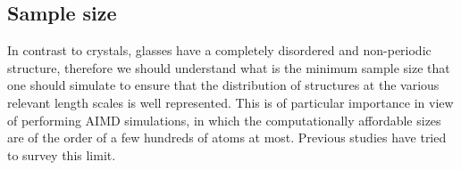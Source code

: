 



\subsection{Sample size}  \label{sec:silica-size}
In contrast to crystals, glasses have a completely disordered and non-periodic structure, therefore we should understand what is the minimum sample size that one should simulate to ensure that the distribution of structures at the various relevant length scales is well represented. This is of particular importance in view of performing AIMD simulations, in which the computationally affordable sizes are of the order of a few hundreds of atoms at most. Previous studies have tried to survey this limit. 


